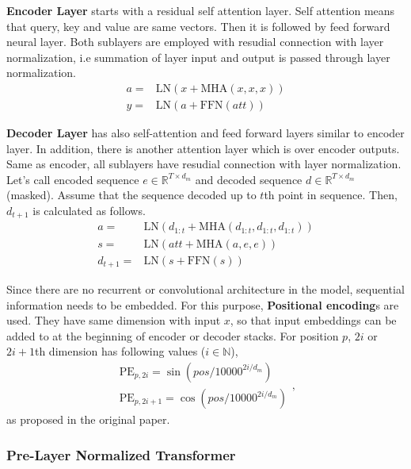 \textbf{Encoder Layer} starts with a residual self attention layer. 
Self attention means that query, key and value are same vectors. 
Then it is followed by feed forward neural layer. 
Both sublayers are employed with resudial connection with layer normalization, 
i.e summation of layer input and output is passed through layer normalization. 
\begin{equation}
\begin{split}
a = & \mathrm{LN}(x + \mathrm{MHA}(x,x,x)) \\
y = & \mathrm{LN}(a + \mathrm{FFN}(att))
\end{split}
\end{equation}

\textbf{Decoder Layer} has also self-attention and feed forward layers similar to encoder layer. 
In addition, there is another attention layer which is over encoder outputs. 
Same as encoder, all sublayers have resudial connection with layer normalization. 
Let's call encoded sequence $e \in \mathbb{R}^{T \times d_m}$ and decoded sequence $d \in \mathbb{R}^{T \times d_m}$ (masked). 
Assume that the sequence decoded up to $t$th point in sequence. 
Then, $d_{t+1}$ is calculated as follows. 
\begin{equation}
\begin{split}
a = & \mathrm{LN}(d_{1:t}+\mathrm{MHA}(d_{1:t},d_{1:t},d_{1:t})) \\
s = & \mathrm{LN}(att+ \mathrm{MHA}(a,e,e)) \\
d_{t+1} = & \mathrm{LN}(s+ \mathrm{FFN}(s))
\end{split}
\end{equation}

Since there are no recurrent or convolutional architecture in the model, sequential information needs to be embedded. 
For this purpose, \textbf{Positional encoding}s are used. 
They have same dimension with input $x$, so that input embeddings can be added to at the beginning of encoder or decoder stacks. 
For position $p$, $2i$ or $2i+1$th dimension has following values ($i \in \mathbb{N}$), 
\begin{equation}
\begin{split}
\mathrm{PE}_{p,2i} = \sin(pos/10000^{2i/d_m}) \\
\mathrm{PE}_{p,2i+1} = \cos(pos/10000^{2i/d_m})
\end{split},
\end{equation}
as proposed in the original paper. 

\subsubsection{Pre-Layer Normalized Transformer}

